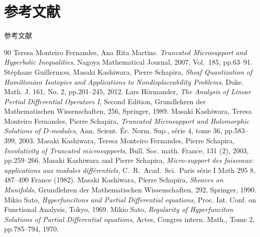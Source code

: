 \documentclass[dvipdfmx,10pt,aspectratio=169,leqno]{beamer}%
\numberwithin{equation}{subsection}
\theoremstyle{mystyle}
\begin{document}
\appendix
\section*{参考文献}

\begin{frame}[allowframebreaks]{参考文献}
  \begin{thebibliography}{90}\beamertemplatetextbibitems
   Teresa Monteiro Fernandes, Ana Rita Martins. 
  \textit{Truncated Microsupport and Hyperbolic Inequalities}, 
  Nagoya Mathematical Journal, 2007, Vol.\ 185, pp.63--91. 
   St\'ephane Guillermou, 
  Masaki Kashiwara, Pierre Schapira, 
  \textit{Sheaf Quantization of Hamiltonian Isotopies and Applications to Nondisplaceability Problems}, 
  Duke. Math. J. 161, No. 2, pp.201--245, 2012.  
   Lars H\"ormander, 
  \textit{The Analysis of Linear Pertial Differential Operators I}, Second Edition,
  Grundlehren der Mathematischen Wissenschaften, 256, Springer, 1989.
   Masaki Kashiwara, Teresa Monteiro Fernandes, Pierre Schapira, 
  \textit{Truncated Microsupport and Holomorphic Solutions 
  of \(D\)-modules}, 
  Ann. Scient. \'Ec. Norm. Sup., s\'erie 4, tome 36, 
  pp.583--399, 2003.
   Masaki Kashiwara, Teresa Monteiro Fernandes, Pierre Schapira, 
  \textit{Involutivity of Truncated microsupports}, 
  Bull. Soc. math. France, 131 (2), 2003, 
  pp.259--266.
   Masaki Kashiwara and Pierre Schapira,
  \textit{Micro-support des faisceaux: applications 
  aux modules diff{\'e}rentiels,}
  C.~R.~Acad.\ Sci.\ Paris s{\'e}rie I Math 295 8, 487--490 France (1982).
   Masaki Kashiwara, Pierre Schapira, 
  \textit{Sheaves on Manifolds}, 
  Grundlehren der Mathematischen Wissenschaften, 292, Springer, 1990.
   Mikio Sato, 
  \textit{Hyperfuncitons and 
  Partial Differential equations}, 
  Proc. Int. Conf. on Functional Analysis, Tokyo, 1969.
   Mikio Sato, 
  \textit{Regularity of Hyperfunciton Solutions of 
  Partial Differential equations}, 
  Actes, Congres intern. Math., 
  Tome 2, pp.785--794, 1970.
\end{thebibliography}
\end{frame}
\end{document}
